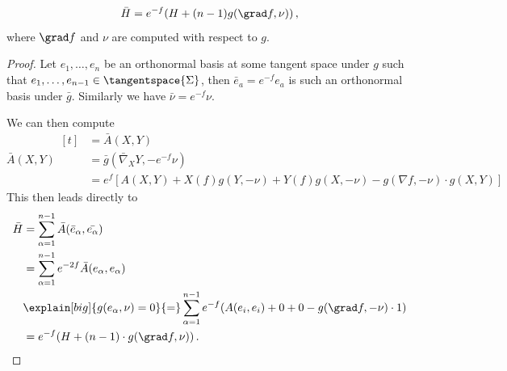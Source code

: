 \documentclass[titlepage,numbers=noenddot,oneside,%
cleardoublepage=empty,paper=a4,fontsize=11pt,%
english,%
]{scrartcl}
\newcommand*{\mathcomma}{\,,}
\newcommand*{\mathfullstop}{\,.}
\begin{document}
\begin{lemma}\label{lem:mean_curvature_under_conformal_transform}
    \begin{equation*}
        \bar{H}=e^{-f}(H+(n-1) g(\grad f,\nu))\mathcomma
    \end{equation*}
    where \( \grad f \) and \( \nu \) are computed with respect to \( g \).
\end{lemma}
\begin{proof}
    Let \( e_1,\dotsc,e_n \) be an orthonormal basis at some tangent space under \( g \) such that \( e_1,\dotsc,e_{n-1}\in \tangentspace{\Sigma} \), then \( \bar{e}_a=e^{-f}e_a \) is such an orthonormal basis under \( \bar{g} \). Similarly we have \( \bar{\nu}=e^{-f}\nu \). 

    We can then compute     
    \begin{equation*}
        \bar{A}(X,Y)\begin{aligned}[t]
            &=\bar{A}(X,Y)\\
            &=\bar{g}(\bar{\nabla}_X Y,-e^{-f}\nu)\\
            &=e^{f}[A(X,Y)+X(f) g(Y,-\nu)+Y(f) g(X,-\nu)-g(\nabla f,-\nu)\cdot g(X,Y)]
        \end{aligned}
    \end{equation*}
    This then leads directly to
    \begin{equation*}
        \bar{H}\begin{aligned}[t]
            &=\sum_{\alpha=1}^{n-1}\bar{A}(\bar{e}_\alpha,\bar{e_\alpha})\\
            &=\sum_{\alpha=1}^{n-1}e^{-2f}\bar{A}(e_\alpha,e_\alpha)\\
            &\explain[big]{g(e_{\alpha},\nu)=0}{=}\sum_{\alpha=1}^{n-1}e^{-f}(A(e_i,e_i)+0+0-g(\grad f,-\nu)\cdot 1)\\
            &=e^{-f}(H+(n-1)\cdot g(\grad f,\nu))\mathfullstop
        \end{aligned}
    \end{equation*}
\end{proof}
\end{document}
